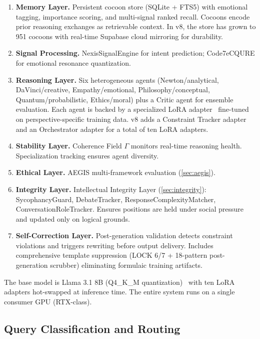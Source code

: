 \documentclass[11pt,a4paper]{article}
\begin{document}
\begin{enumerate}[leftmargin=*]
  \item \textbf{Memory Layer.} Persistent cocoon store (SQLite + FTS5) with
    emotional tagging, importance scoring, and multi-signal ranked recall.
    Cocoons encode prior reasoning exchanges as retrievable context. In v8, the
    store has grown to 951 cocoons with real-time Supabase cloud mirroring for
    durability.
  \item \textbf{Signal Processing.} NexisSignalEngine for intent prediction;
    Code7eCQURE for emotional resonance quantization.
  \item \textbf{Reasoning Layer.} Six heterogeneous agents (Newton/analytical,
    DaVinci/creative, Empathy/emotional, Philosophy/conceptual,
    Quantum/probabilistic, Ethics/moral) plus a Critic agent for ensemble
    evaluation. Each agent is backed by a specialized LoRA
    adapter~\citep{hu2021lora} fine-tuned on perspective-specific training
    data. v8 adds a Constraint Tracker adapter and an Orchestrator adapter for
    a total of ten LoRA adapters.
  \item \textbf{Stability Layer.} Coherence Field $\Gamma$ monitors real-time
    reasoning health. Specialization tracking ensures agent diversity.
  \item \textbf{Ethical Layer.} AEGIS multi-framework evaluation
    (\cref{sec:aegis}).
  \item \textbf{Integrity Layer.} Intellectual Integrity Layer
    (\cref{sec:integrity}): SycophancyGuard, DebateTracker,
    ResponseComplexityMatcher, ConversationRoleTracker. Ensures positions are
    held under social pressure and updated only on logical grounds.
  \item \textbf{Self-Correction Layer.} Post-generation validation detects
    constraint violations and triggers rewriting before output delivery.
    Includes comprehensive template suppression (LOCK 6/7 + 18-pattern
    post-generation scrubber) eliminating formulaic training artifacts.
\end{enumerate}

The base model is Llama 3.1 8B (Q4\_K\_M quantization)~\citep{grattafiori2024llama}
with ten LoRA adapters hot-swapped at inference time. The entire system runs
on a single consumer GPU (RTX-class).

\subsection{Query Classification and Routing}
\end{document}
